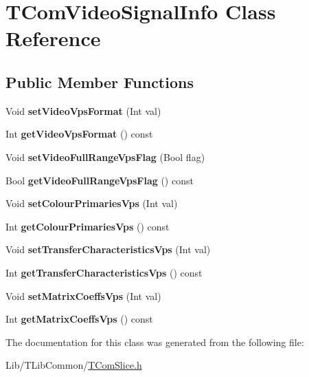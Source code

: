 \hypertarget{class_t_com_video_signal_info}{}\section{T\+Com\+Video\+Signal\+Info Class Reference}
\label{class_t_com_video_signal_info}
\subsection*{Public Member Functions}
\begin{DoxyCompactItemize}
\item 
\mbox{\label{class_t_com_video_signal_info_a13e688f92985c398076bee9540182828}} 
Void {\bfseries set\+Video\+Vps\+Format} (Int val)
\item 
\mbox{\label{class_t_com_video_signal_info_a98568b99b22879ff52bafed9948b0c03}} 
Int {\bfseries get\+Video\+Vps\+Format} () const
\item 
\mbox{\label{class_t_com_video_signal_info_a415cc40aec358d2f70efafbe4598575c}} 
Void {\bfseries set\+Video\+Full\+Range\+Vps\+Flag} (Bool flag)
\item 
\mbox{\label{class_t_com_video_signal_info_a19e7953005efaeebfb641329eeff1781}} 
Bool {\bfseries get\+Video\+Full\+Range\+Vps\+Flag} () const
\item 
\mbox{\label{class_t_com_video_signal_info_ab072877579d2ced8048ae6b3aef9f44c}} 
Void {\bfseries set\+Colour\+Primaries\+Vps} (Int val)
\item 
\mbox{\label{class_t_com_video_signal_info_a298f8a8fefdc14e57e9f5982b5165ea1}} 
Int {\bfseries get\+Colour\+Primaries\+Vps} () const
\item 
\mbox{\label{class_t_com_video_signal_info_a83f9e5458b28e4c69ce07ff2a221753f}} 
Void {\bfseries set\+Transfer\+Characteristics\+Vps} (Int val)
\item 
\mbox{\label{class_t_com_video_signal_info_a50cfc0f14108ce222520e072a0492f02}} 
Int {\bfseries get\+Transfer\+Characteristics\+Vps} () const
\item 
\mbox{\label{class_t_com_video_signal_info_a199836cc826bec90ab38ba4db2b4d7d1}} 
Void {\bfseries set\+Matrix\+Coeffs\+Vps} (Int val)
\item 
\mbox{\label{class_t_com_video_signal_info_a626bae5caf0d32621dfd99df074da159}} 
Int {\bfseries get\+Matrix\+Coeffs\+Vps} () const
\end{DoxyCompactItemize}


The documentation for this class was generated from the following file\+:\begin{DoxyCompactItemize}
\item 
Lib/\+T\+Lib\+Common/\hyperlink{_t_com_slice_8h}{T\+Com\+Slice.\+h}\end{DoxyCompactItemize}
